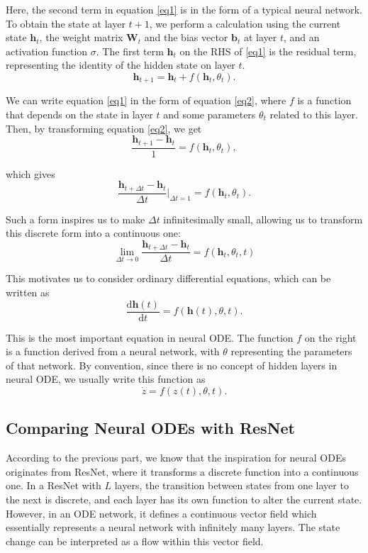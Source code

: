 \documentclass[a4paper,11pt,titlepage]{article}
\theoremstyle{definition}
\theoremstyle{plain}
\theoremstyle{remark}
\begin{document}
Here, the second term in equation \ref{eq1} is in the form of a typical neural network. To obtain the state at layer $t+1$, we perform a calculation using the current state $\textbf{h}_t$, the weight matrix $\textbf{W}_t$ and the bias vector $\textbf{b}_t$ at layer $t$, and an activation function $\sigma$. The first term $\textbf{h}_t$ on the RHS of \ref{eq1} is the residual term, representing the identity of the hidden state on layer $t$.
\begin{equation}\label{eq2}
    \textbf{h}_{t+1} = \textbf{h}_t + f\left(\textbf{h}_t, \theta_t\right).\tag{2}
\end{equation}

We can write equation \ref{eq1} in the form of equation \ref{eq2}, where $f$ is a function that depends on the state in layer $t$ and some parameters $\theta_t$ related to this layer. Then, by transforming equation \ref{eq2}, we get
$$\frac{\textbf{h}_{t+1} - \textbf{h}_t}{1}=f\left(\textbf{h}_t, \theta_t\right),$$

which gives
$$\frac{\textbf{h}_{t+\Delta t} - \textbf{h}_t }{\Delta t}\Bigg|_{\Delta t=1}=f\left(\textbf{h}_t, \theta_t\right).$$

Such a form inspires us to make $\Delta t$ infinitesimally small, allowing us to transform this discrete form into a continuous one:
$$\lim_{\Delta t\to 0}\frac{\textbf{h}_{t+\Delta t} - \textbf{h}_t }{\Delta t}= f(\textbf{h}_t, \theta_t,t)$$

This motivates us to consider ordinary differential equations, which can be written as
$$\frac{\mathrm{d}{\textbf{h}}(t)}{\mathrm{d}t}=f(\textbf{h}(t),\theta,t).$$

This is the most important equation in neural ODE. The function $f$ on the right is a function derived from a neural network, with $\theta$ representing the parameters of that network. By convention, since there is no concept of hidden layers in neural ODE, we usually write this function as
$$\dot{z}=f(z(t),\theta,t).$$

\subsection{Comparing Neural ODEs with ResNet}

According to the previous part, we know that the inspiration for neural ODEs originates from ResNet, where it transforms a discrete function into a continuous one. In a ResNet with $L$ layers, the transition between states from one layer to the next is discrete, and each layer has its own function to alter the current state. However, in an ODE network, it defines a continuous vector field which essentially represents a neural network with infinitely many layers. The state change can be interpreted as a flow within this vector field.
\end{document}
